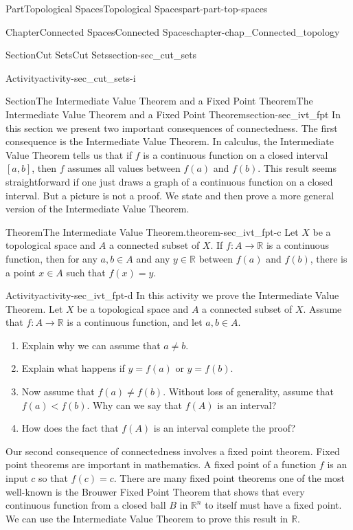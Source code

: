\documentclass[oneside,10pt,]{book}
\numberwithin{equation}{chapter}
\newcommand{\R}{\mathbb{R}}
\newcommand{\lt}{<}
\begin{document}
\begin{partptx}{Part}{Topological Spaces}{}{Topological Spaces}{}{}{part-part-top-spaces}
\begin{chapterptx}{Chapter}{Connected Spaces}{}{Connected Spaces}{}{}{chapter-chap_Connected_topology}
\begin{sectionptx}{Section}{Cut Sets}{}{Cut Sets}{}{}{section-sec_cut_sets}
\begin{activity}{Activity}{}{activity-sec_cut_sets-i}
\end{activity}%
\end{sectionptx}
%
%
\typeout{************************************************}
\typeout{************************************************}
%
\begin{sectionptx}{Section}{The Intermediate Value Theorem and a Fixed Point Theorem}{}{The Intermediate Value Theorem and a Fixed Point Theorem}{}{}{section-sec_ivt_fpt}
In this section we present two important consequences of connectedness. The first consequence is the Intermediate Value Theorem. In calculus, the Intermediate Value Theorem tells us that if \(f\) is a continuous function on a closed interval \([a,b]\), then \(f\) assumes all values between \(f(a)\) and \(f(b)\). This result seems straightforward if one just draws a graph of a continuous function on a closed interval. But a picture is not a proof. We state and then prove a more general version of the Intermediate Value Theorem.%
\begin{theorem}{Theorem}{The Intermediate Value Theorem.}{}{theorem-sec_ivt_fpt-c}%
Let \(X\) be a topological space and \(A\) a connected subset of \(X\). If \(f : A \to \R\) is a continuous function, then for any \(a,b \in A\) and any \(y \in \R\) between \(f(a)\) and \(f(b)\), there is a point \(x \in A\) such that \(f(x) = y\).%
\end{theorem}
\begin{activity}{Activity}{}{activity-sec_ivt_fpt-d}%
In this activity we prove the Intermediate Value Theorem. Let \(X\) be a topological space and \(A\) a connected subset of \(X\). Assume that \(f : A \to \R\) is a continuous function, and let \(a,b \in A\).%
\begin{enumerate}[font=\bfseries,label=(\alph*),ref=\alph*]%
\item{}Explain why we can assume that \(a \neq b\).%
\item{}Explain what happens if \(y = f(a)\) or \(y=f(b)\).%
\item{}Now assume that \(f(a) \neq f(b)\). Without loss of generality, assume that \(f(a) \lt f(b)\). Why can we say that \(f(A)\) is an interval?%
\item{}How does the fact that \(f(A)\) is an interval complete the proof?%
\end{enumerate}%
\end{activity}%
Our second consequence of connectedness involves a fixed point theorem. Fixed point theorems are important in mathematics. A fixed point of a function \(f\) is an input \(c\) so that \(f(c) = c\). There are many fixed point theorems \textemdash{} one of the most well-known is the Brouwer Fixed Point Theorem that shows that every continuous function from a closed ball \(B\) in \(\R^n\) to itself must have a fixed point. We can use the Intermediate Value Theorem to prove this result in \(\R\).%

\end{sectionptx}
\end{chapterptx}
\end{partptx}
\end{document}
